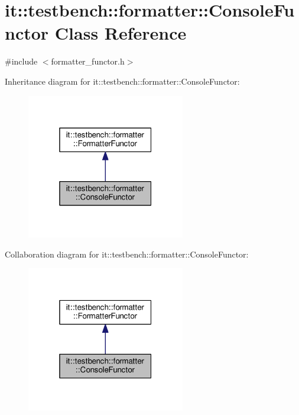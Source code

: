 \hypertarget{classit_1_1testbench_1_1formatter_1_1ConsoleFunctor}{\section{it\-:\-:testbench\-:\-:formatter\-:\-:Console\-Functor Class Reference}
\label{d2/d36/classit_1_1testbench_1_1formatter_1_1ConsoleFunctor}
}


{\ttfamily \#include $<$formatter\-\_\-functor.\-h$>$}



Inheritance diagram for it\-:\-:testbench\-:\-:formatter\-:\-:Console\-Functor\-:
\nopagebreak
\begin{figure}[H]
\begin{center}
\leavevmode
\includegraphics[width=196pt]{d2/d82/classit_1_1testbench_1_1formatter_1_1ConsoleFunctor__inherit__graph}
\end{center}
\end{figure}


Collaboration diagram for it\-:\-:testbench\-:\-:formatter\-:\-:Console\-Functor\-:
\nopagebreak
\begin{figure}[H]
\begin{center}
\leavevmode
\includegraphics[width=196pt]{df/da5/classit_1_1testbench_1_1formatter_1_1ConsoleFunctor__coll__graph}
\end{center}
\end{figure}
